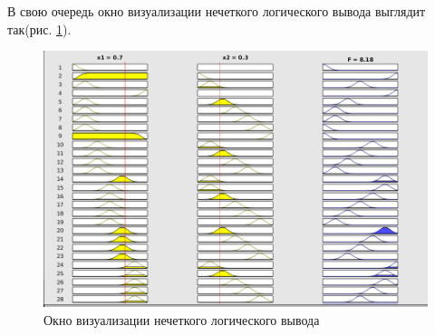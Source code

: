 \documentclass[11pt,a4paper]{report}
\newcommand{\insref}[1]{рис. \ref{#1}}
\begin{document}
	\newpage
	В свою очередь окно визуализации нечеткого логического вывода выглядит так(\insref{fig:logoutput_gaussmf}).
	\begin{figure}[!hbtp]
		\centering
		\includegraphics[width=\linewidth]{logoutput_gaussmf.png}
		\caption{Окно визуализации нечеткого логического вывода}
		\label{fig:logoutput_gaussmf}
	\end{figure}
\end{document}
